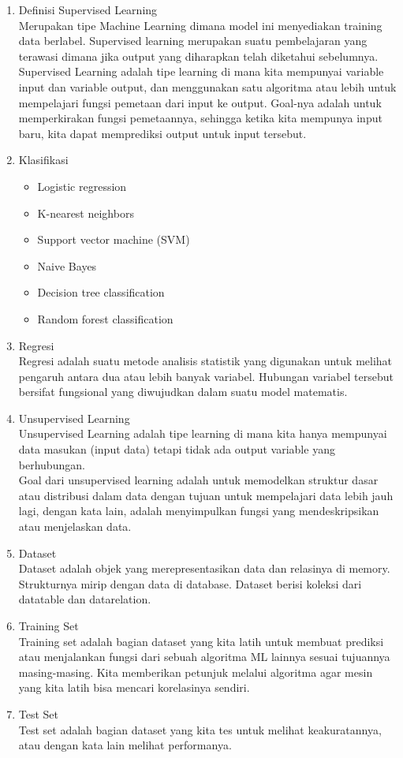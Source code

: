 \begin{enumerate}
\begin{itemize}
\end{itemize}
\item Definisi Supervised Learning \\
Merupakan tipe Machine Learning dimana model ini menyediakan training data berlabel. Supervised learning merupakan suatu pembelajaran yang terawasi dimana jika output yang diharapkan telah diketahui sebelumnya.  Supervised Learning adalah tipe learning di mana kita mempunyai variable input dan variable output, dan menggunakan satu algoritma atau lebih untuk mempelajari fungsi pemetaan dari input ke output. Goal-nya adalah untuk memperkirakan fungsi pemetaannya, sehingga ketika kita mempunya input baru, kita dapat memprediksi output untuk input tersebut.

\item Klasifikasi
\begin{itemize}
\item Logistic regression
\item K-nearest neighbors
\item Support vector machine (SVM)
\item Naive Bayes
\item Decision tree classification
\item Random forest classification
\end{itemize}

\item Regresi \\
Regresi adalah suatu metode analisis statistik yang digunakan untuk melihat pengaruh antara dua atau lebih banyak variabel. Hubungan variabel tersebut bersifat fungsional yang diwujudkan dalam suatu model matematis.

\item Unsupervised Learning \\
Unsupervised Learning adalah tipe learning di mana kita hanya mempunyai data masukan (input data) tetapi tidak ada output variable yang berhubungan.\\
Goal dari unsupervised learning adalah untuk memodelkan struktur dasar atau distribusi dalam data dengan tujuan untuk mempelajari data lebih jauh lagi, dengan kata lain, adalah menyimpulkan fungsi yang mendeskripsikan atau menjelaskan data.

\item Dataset \\
Dataset adalah objek yang merepresentasikan data dan relasinya di memory. Strukturnya mirip dengan data di database. Dataset berisi koleksi dari datatable dan datarelation.
\item Training Set \\
Training set adalah bagian dataset yang kita latih untuk membuat prediksi atau menjalankan fungsi dari sebuah algoritma ML lainnya sesuai tujuannya masing-masing. Kita memberikan petunjuk melalui algoritma agar mesin yang kita latih bisa mencari korelasinya sendiri.
\item Test Set \\
Test set adalah bagian dataset yang kita tes untuk melihat keakuratannya, atau dengan kata lain melihat performanya.

\end{enumerate}


